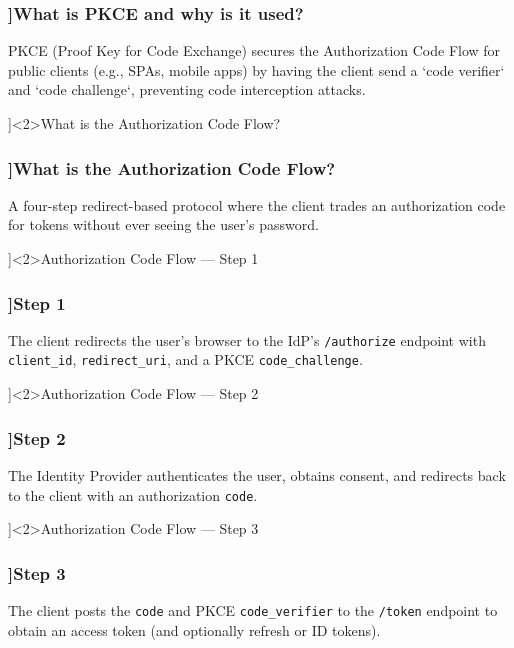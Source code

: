 \begin{frame}[fragile]
  \frametitle{\AnswerTitle[\CategoryBadge[OOPColor!20]{C\#} ]{What is PKCE and why is it used?}}

  {\footnotesize
  PKCE (Proof Key for Code Exchange) secures the Authorization Code Flow for public clients (e.g., SPAs, mobile apps) by having the client send a `code verifier` and `code challenge`, preventing code interception attacks.
  }
\end{frame}

\QuestionSlide[\CategoryBadge[AuthColor!20]{Security}]<2>{What is the Authorization Code Flow?}

\begin{frame}[fragile]
  \frametitle{\AnswerTitle[\CategoryBadge[OOPColor!20]{C\#} ]{What is the Authorization Code Flow?}}

  {\footnotesize
  A four-step redirect-based protocol where the client trades an authorization code for tokens without ever seeing the user's password.
  }
\end{frame}

\QuestionSlide[\CategoryBadge[AuthColor!20]{Security}]<2>{Authorization Code Flow — Step 1}

\begin{frame}[fragile]
  \frametitle{\AnswerTitle[\CategoryBadge[OOPColor!20]{C\#} ]{Step 1}}

  {\footnotesize
  The client redirects the user's browser to the IdP's \texttt{/authorize} endpoint with \texttt{client\_id}, \texttt{redirect\_uri}, and a PKCE \texttt{code\_challenge}.
  }
\end{frame}

\QuestionSlide[\CategoryBadge[AuthColor!20]{Security}]<2>{Authorization Code Flow — Step 2}

\begin{frame}[fragile]
  \frametitle{\AnswerTitle[\CategoryBadge[OOPColor!20]{C\#} ]{Step 2}}

  {\footnotesize
  The Identity Provider authenticates the user, obtains consent, and redirects back to the client with an authorization \texttt{code}.
  }
\end{frame}

\QuestionSlide[\CategoryBadge[AuthColor!20]{Security}]<2>{Authorization Code Flow — Step 3}

\begin{frame}[fragile]
  \frametitle{\AnswerTitle[\CategoryBadge[OOPColor!20]{C\#} ]{Step 3}}

  {\footnotesize
  The client posts the \texttt{code} and PKCE \texttt{code\_verifier} to the \texttt{/token} endpoint to obtain an access token (and optionally refresh or ID tokens).
  }
\end{frame}

